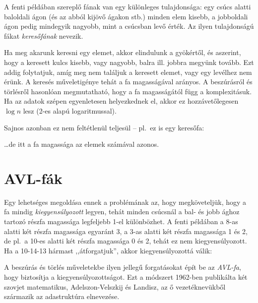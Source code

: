 A fenti példában szereplő fának van egy különleges
tulajdonsága: egy csúcs alatti baloldali ágon (és az
abból kijövő ágakon stb.) minden elem kisebb, a
jobboldali ágon pedig mindegyik nagyobb, mint a
csúcsban levő érték. Az ilyen tulajdonságú fákat
\emph{keresőfának} nevezik.

Ha meg akarunk keresni egy elemet, akkor elindulunk
a gyökértől, és aszerint, hogy a keresett kulcs
kisebb, vagy nagyobb, balra ill. jobbra megyünk
tovább. Ezt addig folytatjuk, amíg meg nem találjuk
a keresett elemet, vagy egy levélhez nem érünk. A
keresés műveletigénye tehát a fa magasságával
arányos. A beszúrásról és törlésről hasonlóan
megmutatható, hogy a fa magasságától függ a
komplexitásuk. Ha az adatok szépen egyenletesen
helyezkednek el, akkor ez hozzávetőlegesen $\log n$
lesz (2-es alapú logaritmussal).

Sajnos azonban ez nem feltétlenül teljesül -- pl.~ez
is egy keresőfa:

\begin{center}
\end{center}
\dots de itt a fa magassága az elemek számával
azonos.

\section{AVL-fák}
Egy lehetséges megoldása ennek a problémának az,
hogy megköveteljük, hogy a fa mindig
\emph{kiegyensúlyozott} legyen, tehát minden
csúcsnál a bal- és jobb ághoz tartozó részfa
magassága legfeljebb 1-el különbözhet. A fenti
példában a 8-as alatti két részfa magassága egyaránt
3, a 3-as alatti két részfa magassága 1 és 2, de
pl.~a 10-es alatti két részfa magassága 0 és 2,
tehát ez nem kiegyensúlyozott. Ha a 10-14-13 hármast
,,átforgatjuk'', akkor kiegyensúlyozottá válik:

\begin{center}
\end{center}
A beszúrás és törlés műveletekbe ilyen jellegű
forgatásokat épít be az \emph{AVL-fa}, hogy
biztosítja a kiegyensúlyozottságot. Ezt a módszert
1962-ben publikálta két szovjet matematikus,
Adelszon-Velszkij és Landisz, az ő vezetéknevükből
származik az adastruktúra elnevezése.

